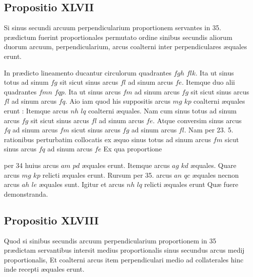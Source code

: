 \documentclass[11pt,a4paper]{article}
\begin{document}
\subsection*{Propositio XLVII}

Si sinus secundi arcuum perpendicularium proportionem servantes in 35. prædictum fuerint proportionales permutato ordine sinibus secundis aliorum duorum arcuum, perpendicularium, arcus coalterni inter perpendiculares æquales erunt.

In prædicto lineamento ducantur circulorum quadrantes $fgh$ $flk$. Ita ut sinus totus ad sinum $fg$ sit sicut sinus arcus $fl$ ad sinum arcus $fe$. Itemque duo alii quadrantes $fmn$ $fqp$. Ita ut sinus arcus $fm$ ad sinum arcus $fg$ sit sicut sinus  arcus $fl$ ad sinum arcus $fq$. Aio iam quod his suppositis arcus $mg$ $kp$ coalterni æquales erunt : Itemque arcus $nh$ $lq$ coalterni æquales. Nam cum sinus totus ad sinum arcus $fg$ sit sicut sinus arcus $fl$ ad sinum arcus $fe$. Atque conversim sinus arcus $fq$ ad sinum arcus $fm$ sicut sinus arcus $fg$ ad sinum arcus $fl$. Nam per 23. 5. rationibus perturbatim collocatis ex æquo sinus totus ad sinum arcus $fm$ sicut sinus arcus $fq$ ad sinum arcus $fe$ Ex qua proportione

per 34 huius arcus $am$ $pd$ æquales erunt. Itemque arcus $ag$ $kd$ æquales. Quare arcus $mg$ $kp$ relicti æquales erunt. Rursum per 35. arcus $an$ $qc$ æquales necnon arcus $ah$ $le$ æquales sunt. Igitur et arcus $nh$ $lq$ relicti æquales erunt Quæ fuere demonstranda.

\subsection*{Propositio XLVIII}

Quod si sinibus secundis arcuum perpendicularium proportionem in 35 prædictam servantibus intersit medius proportionalis sinus secundus arcus medij proportionalis, Et coalterni arcus item perpendiculari medio ad collaterales hinc inde recepti æquales erunt.
\end{document}
